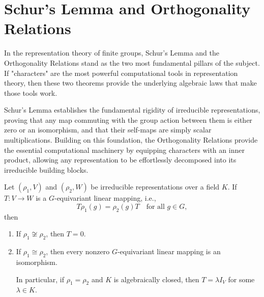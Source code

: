 \chapter{Schur's Lemma and Orthogonality Relations}
In the representation theory of finite groups, Schur's Lemma and the Orthogonality Relations stand as the two most fundamental pillars of the subject. If "characters" are the most powerful computational tools in representation theory, then these two theorems provide the underlying algebraic laws that make those tools work. 

Schur's Lemma establishes the fundamental rigidity of irreducible representations, proving that any map commuting with the group action between them is either zero or an isomorphism, and that their self-maps are simply scalar multiplications. Building on this foundation, the Orthogonality Relations provide the essential computational machinery by equipping characters with an inner product, allowing any representation to be effortlessly decomposed into its irreducible building blocks.


\begin{lemma}\label{Schur's Lemma}
Let \((\rho_1 ,V)\) and \((\rho_2 ,W)\) be irreducible representations over a field \(K\). If  \(T : V \to W\) is a \(G\)-equivariant linear mapping, i.e.,
\[
T \rho_1(g) = \rho_2(g) T \quad \text{for all } g \in G,
\]
then
\begin{enumerate}
\item If \(\rho_1 \not\cong \rho_2\), then \(T = 0\).
\item If \(\rho_1 \cong \rho_2\), then every nonzero \(G\)-equivariant linear mapping is an isomorphism.

In particular, if \(\rho_1 = \rho_2\) and \(K\) is algebraically closed, then \(T = \lambda I_V\) for some \(\lambda \in K\).
\end{enumerate}

\end{lemma}

